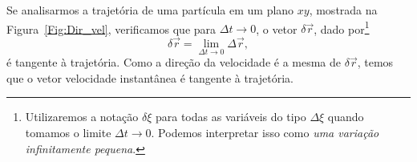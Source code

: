 Se analisarmos a trajetória de uma partícula em um plano $xy$, mostrada na Figura~\ref{Fig:Dir_vel}, verificamos que para $\Delta t \to 0$, o vetor $\delta\vec{r}$, dado por\footnote[][-2cm]{Utilizaremos a notação $\delta \xi$ para todas as variáveis do tipo $\Delta \xi$ quando tomamos o limite $\Delta t \to 0$. Podemos interpretar isso como \emph{uma variação infinitamente pequena}.}
\begin{equation}
    \delta\vec{r} = \lim_{\Delta t \to 0}\Delta \vec{r},
\end{equation}
%
é tangente à trajetória. Como a direção da velocidade é a mesma de $\delta\vec{r}$, temos que o vetor velocidade instantânea é tangente à trajetória.


